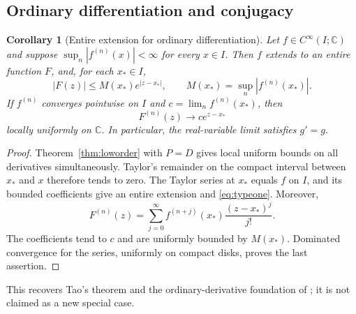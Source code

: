 \documentclass[11pt,reqno]{amsart}
\numberwithin{equation}{section}
\newtheorem{corollary}[theorem]{Corollary}
\theoremstyle{definition}
\theoremstyle{remark}
\newcommand{\C}{\mathbb C}
\begin{document}
\subsection{Ordinary differentiation and conjugacy}
\begin{corollary}[Entire extension for ordinary differentiation]\label{cor:entire}
Let $f\in C^\infty(I;\C)$ and suppose $\sup_n|f^{(n)}(x)|<\infty$ for every $x\in I$. Then $f$ extends to an entire function $F$, and, for each $x_*\in I$,
\begin{equation}\label{eq:typeone}
 |F(z)|\le M(x_*)e^{|z-x_*|},\qquad
 M(x_*)=\sup_n|f^{(n)}(x_*)|.
\end{equation}
If $f^{(n)}$ converges pointwise on $I$ and $c=\lim_n f^{(n)}(x_*)$, then
\[
 F^{(n)}(z)\longrightarrow c e^{z-x_*}
\]
locally uniformly on $\C$. In particular, the real-variable limit satisfies $g'=g$.
\end{corollary}
\begin{proof}
Theorem~\ref{thm:loworder} with $P=D$ gives local uniform bounds on all derivatives simultaneously. Taylor's remainder on the compact interval between $x_*$ and $x$ therefore tends to zero. The Taylor series at $x_*$ equals $f$ on $I$, and its bounded coefficients give an entire extension and \eqref{eq:typeone}. Moreover,
\[
 F^{(n)}(z)=\sum_{j=0}^{\infty}
          f^{(n+j)}(x_*)\frac{(z-x_*)^j}{j!}.
\]
The coefficients tend to $c$ and are uniformly bounded by $M(x_*)$. Dominated convergence for the series, uniformly on compact disks, proves the last assertion.
\end{proof}
This recovers Tao's theorem \cite{tao} and the ordinary-derivative foundation of \cite{project}; it is not claimed as a new special case.
\end{document}
